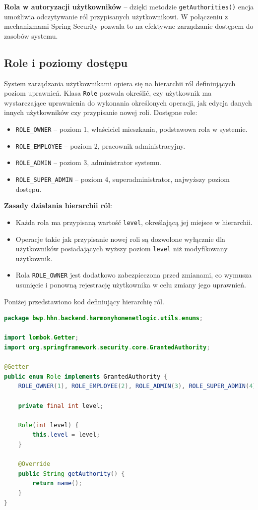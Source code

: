 \noindent \textbf{Rola w autoryzacji użytkowników} -- dzięki metodzie \texttt{getAuthorities()} encja umożliwia odczytywanie ról przypisanych użytkownikowi. W połączeniu z mechanizmami Spring Security pozwala to na efektywne zarządzanie dostępem do zasobów systemu.

\subsection{Role i poziomy dostępu}

System zarządzania użytkownikami opiera się na hierarchii ról definiujących poziom uprawnień. Klasa \texttt{Role} pozwala określić, czy użytkownik ma wystarczające uprawnienia do wykonania określonych operacji, jak edycja danych innych użytkowników czy przypisanie nowej roli. Dostępne role:
\begin{itemize}
    \item \texttt{ROLE\_OWNER} -- poziom 1, właściciel mieszkania, podstawowa rola w systemie.
    \item \texttt{ROLE\_EMPLOYEE} -- poziom 2, pracownik administracyjny.
    \item \texttt{ROLE\_ADMIN} -- poziom 3, administrator systemu.
    \item \texttt{ROLE\_SUPER\_ADMIN} -- poziom 4, superadministrator, najwyższy poziom dostępu.
\end{itemize}

\noindent \textbf{Zasady działania hierarchii ról}:
\begin{itemize}
    \item Każda rola ma przypisaną wartość \texttt{level}, określającą jej miejsce w hierarchii.
    \item Operacje takie jak przypisanie nowej roli są dozwolone wyłącznie dla użytkowników posiadających wyższy poziom \texttt{level} niż modyfikowany użytkownik.
    \item Rola \texttt{ROLE\_OWNER} jest dodatkowo zabezpieczona przed zmianami, co wymusza usunięcie i ponowną rejestrację użytkownika w celu zmiany jego uprawnień.
\end{itemize}

\noindent Poniżej przedstawiono kod definiujący hierarchię ról.
\begin{lstlisting}[language=Java, style=JavaStyle, caption=Definicja ról w systemie \texttt{Role}]
package bwp.hhn.backend.harmonyhomenetlogic.utils.enums;

import lombok.Getter;
import org.springframework.security.core.GrantedAuthority;

@Getter
public enum Role implements GrantedAuthority {
    ROLE_OWNER(1), ROLE_EMPLOYEE(2), ROLE_ADMIN(3), ROLE_SUPER_ADMIN(4);

    private final int level;

    Role(int level) {
        this.level = level;
    }

    @Override
    public String getAuthority() {
        return name();
    }
}
\end{lstlisting}

